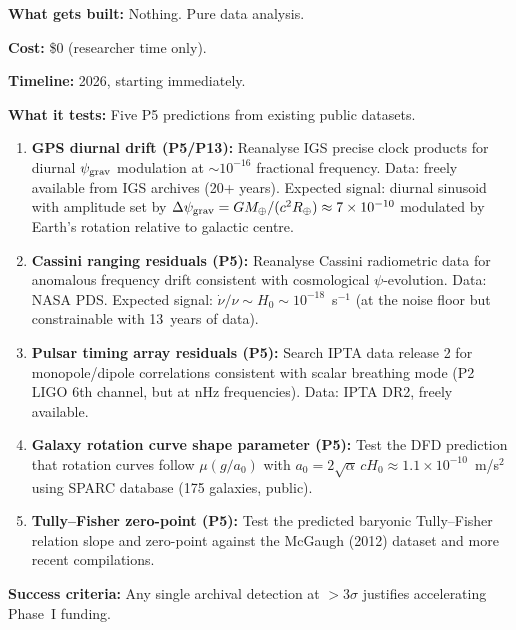\documentclass[11pt]{article}
\newcommand{\ee}[1]{\times 10^{#1}}
\newcommand{\psigrav}{\psi_{\rm grav}}
\begin{document}
\begin{tcolorbox}[colback=green!5!white, colframe=green!40!black,
  title=\textbf{Phase 0: Zero-Cost Archival Tests}]

\textbf{What gets built:} Nothing. Pure data analysis.

\textbf{Cost:} \$0 (researcher time only).

\textbf{Timeline:} 2026, starting immediately.

\textbf{What it tests:} Five P5 predictions from existing public datasets.

\begin{enumerate}[nosep]
\item \textbf{GPS diurnal drift (P5/P13):} Reanalyse IGS precise clock
  products for diurnal $\psigrav$ modulation at $\sim 10^{-16}$ fractional
  frequency. Data: freely available from IGS archives (20+ years).
  Expected signal: diurnal sinusoid with amplitude set by
  $\Delta\psigrav = GM_\oplus/(c^2 R_\oplus) \approx 7\ee{-10}$
  modulated by Earth's rotation relative to galactic centre.

\item \textbf{Cassini ranging residuals (P5):} Reanalyse Cassini
  radiometric data for anomalous frequency drift consistent with
  cosmological $\psi$-evolution. Data: NASA PDS. Expected signal:
  $\dot{\nu}/\nu \sim H_0 \sim 10^{-18}$~s$^{-1}$ (at the noise floor
  but constrainable with 13~years of data).

\item \textbf{Pulsar timing array residuals (P5):} Search IPTA data
  release 2 for monopole/dipole correlations consistent with scalar
  breathing mode (P2 LIGO 6th channel, but at nHz frequencies).
  Data: IPTA DR2, freely available.

\item \textbf{Galaxy rotation curve shape parameter (P5):} Test the
  DFD prediction that rotation curves follow $\mu(g/a_0)$ with
  $a_0 = 2\sqrt{\alpha}\,cH_0 \approx 1.1\ee{-10}$~m/s$^2$
  using SPARC database (175 galaxies, public).

\item \textbf{Tully--Fisher zero-point (P5):} Test the predicted
  baryonic Tully--Fisher relation slope and zero-point against the
  McGaugh (2012) dataset and more recent compilations.
\end{enumerate}

\textbf{Success criteria:} Any single archival detection at $>3\sigma$
justifies accelerating Phase~I funding.
\end{tcolorbox}
\end{document}

